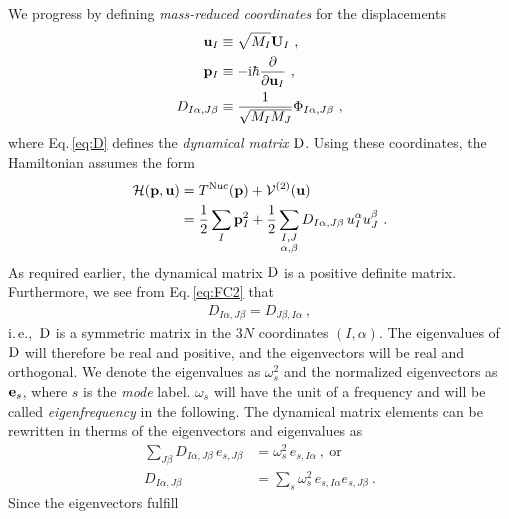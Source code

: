 We progress by defining \emph{mass-reduced coordinates} for the displacements
\begin{align}
	{\bf u}_I 
		&\equiv \sqrt{M_I} {\bf U}_I~, 
		\label{eq:uI} \\
	{\bf p}_I 
		&\equiv -\im \hbar \frac{\partial}{\partial {\bf u}_I}~,
		\label{eq:pI} \\
	D_{I \alpha, J \beta}
		&\equiv \frac{1}{\sqrt{M_I M_J}} 
		\Phi_{I \alpha, J \beta}~,
		\label{eq:D}
\end{align}
where Eq.\,\eqref{eq:D} defines the \emph{dynamical matrix} $\rm D$.
Using these coordinates, the Hamiltonian assumes the form
\begin{align}
	\begin{split}
		\mathcal{H}({\bf p}, {\bf u})
			&= T^{\rm Nuc} ({\bf p}) + \mathcal{V}^{(2)} ({\bf u})\\
			&= \halb \sum_I {\bf p}_I^2 + 
				\halb \sum_{\substack{I, J \\ \alpha, \beta}}
					D_{I \alpha, J \beta}
					\, u_I^\alpha u_J^\beta~.
	\end{split}
	\label{eq:ha.H1}
\end{align}
As required earlier, the dynamical matrix $\rm D$ is a positive definite matrix. Furthermore, we see from Eq.\,\eqref{eq:FC2} that
\begin{align}
	D_{I \alpha, J \beta} = D_{J \beta, I \alpha}~,
	\label{eq:D.symmetric}
\end{align}
i.\,e.,~$\rm D$ is a symmetric matrix in the $3N$ coordinates $(I, \alpha)$. The eigenvalues of $\rm D$ will therefore be real and positive, and the eigenvectors will be real and orthogonal. We denote the eigenvalues as $\omega_s^2$ and the normalized eigenvectors as ${\bf e}_s$, where $s$ is the \emph{mode} label. $\omega_s$ will have the unit of a frequency and  will be called \emph{eigenfrequency} in the following. The dynamical matrix elements can be rewritten in therms of the eigenvectors and eigenvalues as
\begin{subequations}
\begin{align}
	\sum_{J \beta}
		D_{I \alpha, J \beta} \, e_{s, J \beta} 
			&= \omega^2_s \, e_{s, I \alpha}~,~\text{or} 
			\label{eq:sum_D_IJ} \\
		D_{I \alpha, J \beta}
			&= \sum_s \omega^2_s \, e_{s, I \alpha} e_{s, J \beta}~.
			\label{eq:D_IJs}
\end{align}
\end{subequations}
Since the eigenvectors fulfill
